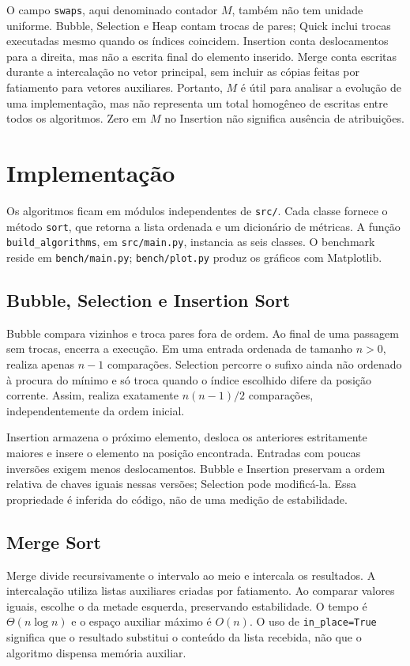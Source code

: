 \documentclass[12pt]{uftex}
\begin{document}
O campo \texttt{swaps}, aqui denominado contador $M$, também não tem unidade uniforme. Bubble, Selection e Heap contam trocas de pares; Quick inclui trocas executadas mesmo quando os índices coincidem. Insertion conta deslocamentos para a direita, mas não a escrita final do elemento inserido. Merge conta escritas durante a intercalação no vetor principal, sem incluir as cópias feitas por fatiamento para vetores auxiliares. Portanto, $M$ é útil para analisar a evolução de uma implementação, mas não representa um total homogêneo de escritas entre todos os algoritmos. Zero em $M$ no Insertion não significa ausência de atribuições.

\chapter{Implementação}
Os algoritmos ficam em módulos independentes de \texttt{src/}. Cada classe fornece o método \texttt{sort}, que retorna a lista ordenada e um dicionário de métricas. A função \texttt{build\_algorithms}, em \texttt{src/main.py}, instancia as seis classes. O benchmark reside em \texttt{bench/main.py}; \texttt{bench/plot.py} produz os gráficos com Matplotlib.

\section{Bubble, Selection e Insertion Sort}
Bubble compara vizinhos e troca pares fora de ordem. Ao final de uma passagem sem trocas, encerra a execução. Em uma entrada ordenada de tamanho $n>0$, realiza apenas $n-1$ comparações. Selection percorre o sufixo ainda não ordenado à procura do mínimo e só troca quando o índice escolhido difere da posição corrente. Assim, realiza exatamente $n(n-1)/2$ comparações, independentemente da ordem inicial.

Insertion armazena o próximo elemento, desloca os anteriores estritamente maiores e insere o elemento na posição encontrada. Entradas com poucas inversões exigem menos deslocamentos. Bubble e Insertion preservam a ordem relativa de chaves iguais nessas versões; Selection pode modificá-la. Essa propriedade é inferida do código, não de uma medição de estabilidade.

\section{Merge Sort}
Merge divide recursivamente o intervalo ao meio e intercala os resultados. A intercalação utiliza listas auxiliares criadas por fatiamento. Ao comparar valores iguais, escolhe o da metade esquerda, preservando estabilidade. O tempo é $\Theta(n\log n)$ e o espaço auxiliar máximo é $O(n)$. O uso de \texttt{in\_place=True} significa que o resultado substitui o conteúdo da lista recebida, não que o algoritmo dispensa memória auxiliar.
\end{document}
